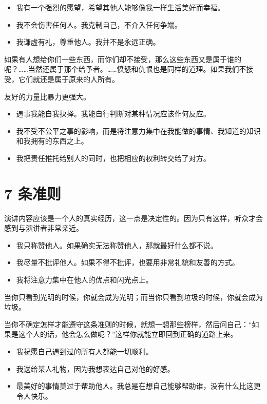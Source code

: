 \documentclass[fontset=founder]{ctexart}
\begin{document}
\begin{itemize}
    \item 我有一个强烈的愿望，希望其他人能够像我一样生活美好而幸福。
    \item 我不会伤害任何人。我克制自己，不介入任何争端。
    \item 我谦虚有礼，尊重他人。我并不是永远正确。
\end{itemize}


如果有人想给你们一些东西，而你们却不接受，那么这些东西又是属于谁的呢？……当然还属于那个给予者。……愤怒和仇恨也是同样的道理。如果我们不接受，它们就还是属于原来的人所有。

友好的力量比暴力更强大。

\begin{itemize}
    \item 遇事我能自我抉择。我能自行判断对某种情况应该作何反应。
    \item 我不受不公平之事的影响，而是将注意力集中在我能做的事情、我知道的知识和我拥有的东西之上。
    \item 我把责任推托给别人的同时，也把相应的权利转交给了对方。
\end{itemize}

\section{7 条准则}

演讲内容应该是一个人的真实经历，这一点是决定性的。因为只有这样，听众才会感到与演讲者非常亲近。

\begin{itemize}
    \item 我只称赞他人。如果确实无法称赞他人，那就最好什么都不说。
    \item 我尽量不批评他人。如果不得不批评，也要用非常礼貌和友善的方式。
    \item 我将注意力集中在他人的优点和闪光点上。
\end{itemize}

当你只看到光明的时候，你就会成为光明；而当你只看到垃圾的时候，你就会成为垃圾。

当你不确定怎样才能遵守这条准则的时候，就想一想那些榜样，然后问自己：“如果是这个人的话，他会怎么做呢？”这样你就能立即回到正确的道路上来。

\begin{itemize}
    \item 我祝愿自己遇到过的所有人都能一切顺利。
    \item 我送给某人礼物，因为我想表达自己对他的好感。
    \item 最美好的事情莫过于帮助他人。我总是在想自己能够帮助谁，没有什么比这更令人快乐。
\end{itemize}
\end{document}
